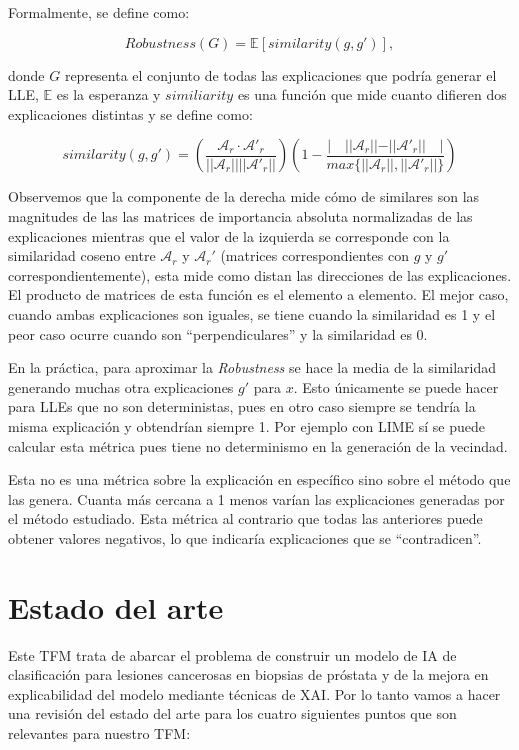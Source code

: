 Formalmente, se define como:

\begin{equation}
Robustness(G) =  \mathbb{E}[similarity(g,g')],
\end{equation}

donde $G$ representa el conjunto de todas las explicaciones que podría generar el LLE, $\mathbb{E}$ es la esperanza y $similiarity$ es una función que mide cuanto difieren dos explicaciones distintas y se define como:

\begin{equation}
similarity(g,g') = \left(\frac{\mathcal{A}_r\cdot \mathcal{A}'_r}{||\mathcal{A}_r|| ||\mathcal{A}'_r||} \right)  \left(1-  \frac{|\quad  ||\mathcal{A}_r||-||\mathcal{A}'_r|| \quad |}{max\{||\mathcal{A}_r||,||\mathcal{A}'_r||\}}\right)
\end{equation}

Observemos que la componente de la derecha mide cómo de similares son las magnitudes de las las matrices de importancia absoluta normalizadas de las explicaciones mientras que el valor de la izquierda se corresponde con la similaridad coseno entre $\mathcal{A}_r$ y $\mathcal{A}_r'$ (matrices correspondientes con $g$ y $g'$ correspondientemente), esta mide como distan las direcciones de las explicaciones. El producto de matrices de esta función es el elemento a elemento. El mejor caso, cuando ambas explicaciones son iguales, se tiene cuando la similaridad es 1 y el peor caso ocurre cuando son ``perpendiculares'' y la similaridad es 0. 

En la práctica, para aproximar la \textit{Robustness} se hace la media de la similaridad generando muchas otra explicaciones $g'$ para $x$. Esto únicamente se puede hacer para LLEs que no son deterministas, pues en otro caso siempre se tendría la misma explicación y obtendrían siempre 1. Por ejemplo con LIME sí se puede calcular esta métrica pues tiene no determinismo en la generación de la vecindad.


Esta no es una métrica sobre la explicación en específico sino sobre el método que las genera. Cuanta más cercana a 1 menos varían las explicaciones generadas por el método estudiado. Esta métrica al contrario que todas las anteriores puede obtener valores negativos, lo que indicaría explicaciones que se ``contradicen''.




\newpage
\chapter{Estado del arte} \label{cap:eda}
Este TFM trata de abarcar el problema de construir un modelo de IA de clasificación para lesiones cancerosas en biopsias de próstata y de la mejora en explicabilidad del modelo mediante técnicas de XAI. Por lo tanto vamos a hacer una revisión del estado del arte para los cuatro siguientes puntos que son relevantes para nuestro TFM:


